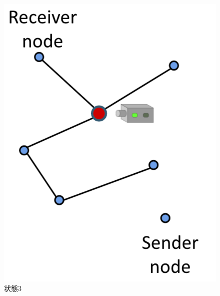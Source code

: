 \begin{figure}[H]
\begin{minipage}[b]{0.3\textwidth}
    \includegraphics[width=\textwidth]{lesson4/network_state3.pdf}
    \caption{状態3}
  \end{minipage}
  \hfill
  \begin{minipage}[b]{0.3\textwidth}

\end{minipage}
\end{figure}
